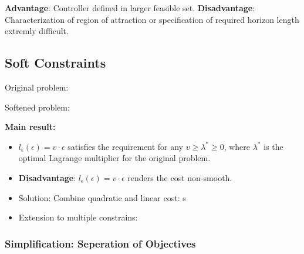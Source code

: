\documentclass[8pt,a4paper]{scrartcl}
\begin{document}
\begin{multicols*}{3}
\finn

\textbf{Advantage}: Controller defined in larger feasible set.
\textbf{Disadvantage}: Characterization of region of attraction or specification of required horizon length extremly difficult.

\finn


\subsection{Soft Constraints}

Original problem:


Softened problem:




\textbf{Main result:}

\begin{itemize}
\ncompaq
\item $l_\epsilon(\epsilon)=v\cdot\epsilon$ satisfies the requirement for any $v\geq\lambda^\ast\geq0$, where $\lambda^\ast$ is the optimal Lagrange multiplier for the original problem.
\item \textbf{Disadvantage}: $l_\epsilon(\epsilon)=v\cdot\epsilon$ renders the cost non-smooth.
\item Solution: Combine quadratic and linear cost:
s


\item Extension to multiple constrains:

\end{itemize}

\subsubsection{Simplification: Seperation of Objectives}


\end{multicols*}
\end{document}
